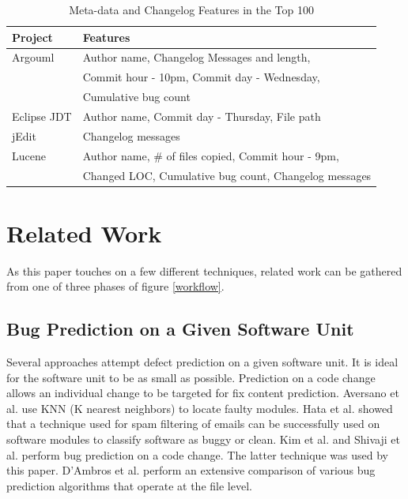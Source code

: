 \documentclass[preprint,10pt]{sigplanconf}
\begin{document}
\begin{table}[t]
\caption{Meta-data and Changelog Features in the Top 100}
\label{table:Top100Meta}
\begin{center}
\begin{tabular}{ll}

\hline
Project        & Features  \\ \hline
{\sc Argouml}   & Author name, Changelog  Messages and length, \\ & Commit hour - 10pm, Commit day - Wednesday, \\ &Cumulative bug count 	\\ \hline
{\sc Eclipse JDT}  & Author name, Commit day - Thursday, File path 	\\ \hline
{\sc jEdit}  & Changelog messages 	\\ \hline
{\sc Lucene}     & Author name, \# of files copied, Commit hour - 9pm, \\  & Changed LOC, Cumulative bug count, Changelog messages 	\\ \hline

\end{tabular}
\end{center}
\label{table:topFeatures}
\end{table}

\section{Related Work}
\label{RelatedWork}

\par As this paper touches on a few different techniques, related work can be gathered from one of three phases of figure \ref{workflow}. 


\subsection{Bug Prediction on a Given Software Unit} 
\par Several approaches attempt defect prediction on a given software unit. It is ideal for the software unit to be as small as possible. Prediction on a code change allows an individual change to be targeted for fix content prediction. Aversano et al. \cite{aversano2007lbi} use KNN (K nearest neighbors) to locate faulty modules.  Hata et al. \cite{Hata2008} showed that a technique used for spam filtering of emails can be successfully used on software modules to classify software as buggy or clean. Kim et al. \cite{Kim2007p58} and Shivaji et al. \cite{shivaji2009reducing} perform bug prediction on a code change. The latter technique was used by this paper. D'Ambros et al. \cite{d2011evaluating} perform an extensive comparison of various bug prediction algorithms that operate at the file level.
\end{document}
